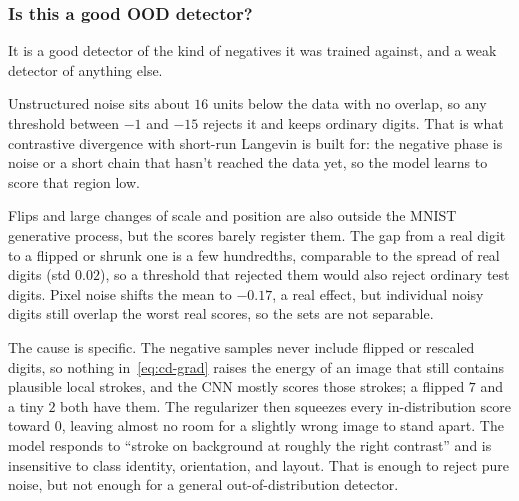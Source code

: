\subsubsection{Is this a good OOD detector?}

It is a good detector of the kind of negatives it was trained against, and a weak detector of anything else.

Unstructured noise sits about \(16\) units below the data with no overlap, so any threshold between \(-1\) and \(-15\) rejects it and keeps ordinary digits. That is what contrastive divergence with short-run Langevin is built for: the negative phase is noise or a short chain that hasn't reached the data yet, so the model learns to score that region low.

Flips and large changes of scale and position are also outside the MNIST generative process, but the scores barely register them. The gap from a real digit to a flipped or shrunk one is a few hundredths, comparable to the spread of real digits (std \(0.02\)), so a threshold that rejected them would also reject ordinary test digits. Pixel noise shifts the mean to \(-0.17\), a real effect, but individual noisy digits still overlap the worst real scores, so the sets are not separable.

The cause is specific. The negative samples never include flipped or rescaled digits, so nothing in~\eqref{eq:cd-grad} raises the energy of an image that still contains plausible local strokes, and the CNN mostly scores those strokes; a flipped \(7\) and a tiny \(2\) both have them. The regularizer then squeezes every in-distribution score toward \(0\), leaving almost no room for a slightly wrong image to stand apart. The model responds to ``stroke on background at roughly the right contrast'' and is insensitive to class identity, orientation, and layout. That is enough to reject pure noise, but not enough for a general out-of-distribution detector.

